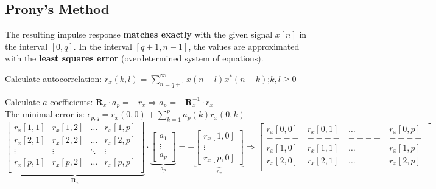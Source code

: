\vspace{-1.0cm}


\subsection{Prony's Method }
The resulting impulse response \textbf{matches exactly} with the given signal $x[n]$ in the interval $[0, q]$.
In the interval $[q + 1, n-1]$, the values are approximated with the
\textbf{least squares error} (overdetermined system of equations).


\renewcommand{\arraystretch}{1.0}

\begin{aufzaehlung}
	\item Calculate autocorrelation: $ r_x(k,l) = \sum\limits_{n=q+1}^\infty x(n-l)x^*(n-k)$;\qquad $k,l\geq 0$
	\item Calculate $a$-coefficients: $\bm R_x \cdot a_p = -r_x \Longrightarrow a_p = - \bm R_x^{-1} \cdot r_x$ 
  		 \small\\
		The minimal error is: $\epsilon_{p,q} = r_x(0,0) + \sum\limits_{k=1}^p a_p(k) r_x(0,k)$
			$$
		\underbrace{\begin{bmatrix}
    		r_x[1,1] & r_x[1,2] & \hdots & r_x[1,p] \\
    		r_x[2,1] & r_x[2,2] & \hdots & r_x[2,p] \\
    		\vdots & \vdots & \ddots & \vdots \\
    		r_x[p,1] & r_x[p,2] & \hdots & r_x[p,p] \\
		\end{bmatrix}  }_{\bm R_x} \cdot
		\underbrace{\begin{bmatrix}
    		a_1 \\
    		\vdots \\
    		a_p
		\end{bmatrix}  }_{a_p}= -\underbrace{\begin{bmatrix}
    		r_x[1,0] \\
    		\vdots \\
    		r_x[p,0]
		\end{bmatrix}  }_{r_x}
		\Longrightarrow
		\begin{bmatrix}
    		r_x[0,0] & r_x[0,1] & \hdots & r_x[0,p] \\ 
    		----&----&----&----\\
    		r_x[1,0] & r_x[1,1] & \hdots & r_x[1,p] \\                                   
    		r_x[2,0] & r_x[2,1] & \hdots & r_x[2,p] \\

\end{bmatrix}$$
\end{aufzaehlung}
